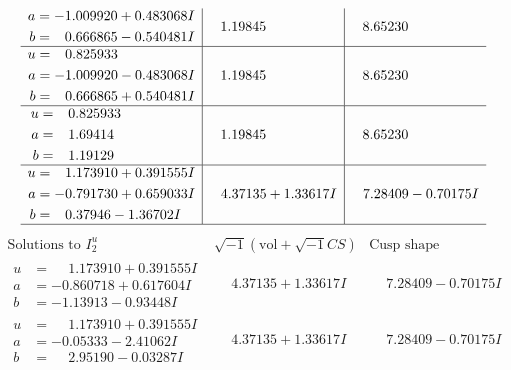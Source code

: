 \documentclass[1p]{elsarticle_modified}
\theoremstyle{definition}
\newcommand{\I}{\sqrt{-1}}
\begin{document}
$$\begin{array}{c|c|c}
\begin{aligned}
a &= -1.009920 + 0.483068 I \\
b &= \phantom{-}0.666865 - 0.540481 I\end{aligned}
 & \phantom{-}1.19845\phantom{ +0.000000I} & \phantom{-}8.65230\phantom{ +0.000000I} \\ \hline\begin{aligned}
u &= \phantom{-}0.825933\phantom{ +0.000000I} \\
a &= -1.009920 - 0.483068 I \\
b &= \phantom{-}0.666865 + 0.540481 I\end{aligned}
 & \phantom{-}1.19845\phantom{ +0.000000I} & \phantom{-}8.65230\phantom{ +0.000000I} \\ \hline\begin{aligned}
u &= \phantom{-}0.825933\phantom{ +0.000000I} \\
a &= \phantom{-}1.69414\phantom{ +0.000000I} \\
b &= \phantom{-}1.19129\phantom{ +0.000000I}\end{aligned}
 & \phantom{-}1.19845\phantom{ +0.000000I} & \phantom{-}8.65230\phantom{ +0.000000I} \\ \hline\begin{aligned}
u &= \phantom{-}1.173910 + 0.391555 I \\
a &= -0.791730 + 0.659033 I \\
b &= \phantom{-}0.37946 - 1.36702 I\end{aligned}
 & \phantom{-}4.37135 + 1.33617 I & \phantom{-}7.28409 - 0.70175 I\\
 \hline 
 \end{array}$$\newpage$$\begin{array}{c|c|c}  
\text{Solutions to }I^u_{2}& \I (\text{vol} + \sqrt{-1}CS) & \text{Cusp shape}\\
 \hline 
\begin{aligned}
u &= \phantom{-}1.173910 + 0.391555 I \\
a &= -0.860718 + 0.617604 I \\
b &= -1.13913 - 0.93448 I\end{aligned}
 & \phantom{-}4.37135 + 1.33617 I & \phantom{-}7.28409 - 0.70175 I \\ \hline\begin{aligned}
u &= \phantom{-}1.173910 + 0.391555 I \\
a &= -0.05333 - 2.41062 I \\
b &= \phantom{-}2.95190 - 0.03287 I\end{aligned}
 & \phantom{-}4.37135 + 1.33617 I & \phantom{-}7.28409 - 0.70175 I \\ \hline\begin{aligned}

\end{aligned}
\end{array}$$
\end{document}
